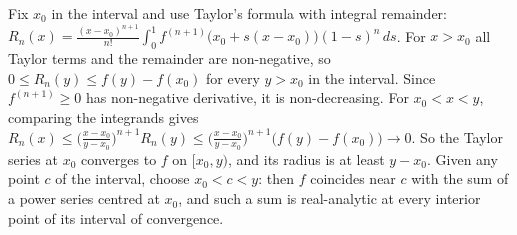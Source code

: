 \documentclass[11pt,a4paper]{article}
\begin{document}
Fix \(x_0\) in the interval and use Taylor's formula with integral remainder: \(R_n(x)=\frac{(x-x_0)^{n+1}}{n!}\int_0^1f^{(n+1)}\bigl(x_0+s(x-x_0)\bigr)(1-s)^n\,ds\). For \(x\gt x_0\) all Taylor terms and the remainder are non-negative, so \(0\le R_n(y)\le f(y)-f(x_0)\) for every \(y\gt x_0\) in the interval.
Since \(f^{(n+1)}\ge0\) has non-negative derivative, it is non-decreasing. For \(x_0\lt x\lt y\), comparing the integrands gives \(R_n(x)\le\bigl(\frac{x-x_0}{y-x_0}\bigr)^{n+1}R_n(y)\le\bigl(\frac{x-x_0}{y-x_0}\bigr)^{n+1}\bigl(f(y)-f(x_0)\bigr)\to0\).
So the Taylor series at \(x_0\) converges to \(f\) on \([x_0,y)\), and its radius is at least \(y-x_0\). Given any point \(c\) of the interval, choose \(x_0\lt c\lt y\): then \(f\) coincides near \(c\) with the sum of a power series centred at \(x_0\), and such a sum is real-analytic at every interior point of its interval of convergence.
\end{document}
